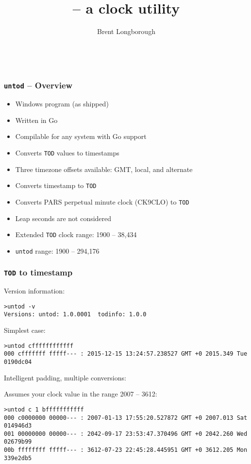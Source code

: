 \documentclass[10pt,xcolor=x11names]{beamer}
\title{\untod{} -- a \tod{} clock utility}
\author{Brent Longborough}
\date[\gitAuthorDate]{\gitAuthorDate\\\gitAbbrevHash}
\newcommand{\untod}{\texttt{untod}}
\newcommand{\tod}{\texttt{TOD}}
\begin{document}
\begin{frame}
\titlepage
\end{frame}
\begin{frame}
  \frametitle{\untod{} -- Overview}
  \begin{itemize}
  \item Windows program (as shipped)
  \item Written in Go
  \item Compilable for any system with Go support
  \item Converts \tod{} values to timestamps
  \item Three timezone offsets available: GMT, local, and alternate
  \item Converts timestamp to \tod{}
  \item Converts PARS perpetual minute clock (CK9CLO) to \tod{}
  \item Leap seconds are not considered
  \item Extended \tod{} clock range: 1900 -- 38,434
  \item \untod{} range: 1900 -- 294,176
  \end{itemize}
\end{frame}
\begin{frame}[fragile]
  \frametitle{\tod{} to timestamp}
  \begin{block}{Version information:}

  \begin{lstlisting}
>untod -v
Versions: untod: 1.0.0001  todinfo: 1.0.0
  \end{lstlisting}
  \end{block}

  \begin{block}{Simplest case:}

  \begin{lstlisting}
>untod cffffffffffff
000 cfffffff fffff--- : 2015-12-15 13:24:57.238527 GMT +0 2015.349 Tue 0190dc04
  \end{lstlisting}
  \end{block}

  \begin{block}{Intelligent padding, multiple conversions:}

Assumes your clock value in the range 2007 -- 3612:

  \begin{lstlisting}
>untod c 1 bfffffffffff
000 c0000000 00000--- : 2007-01-13 17:55:20.527872 GMT +0 2007.013 Sat 014946d3
001 00000000 00000--- : 2042-09-17 23:53:47.370496 GMT +0 2042.260 Wed 02679b99
00b ffffffff fffff--- : 3612-07-23 22:45:28.445951 GMT +0 3612.205 Mon 339e2db5
  \end{lstlisting}
  \end{block}

\end{frame}
\end{document}

